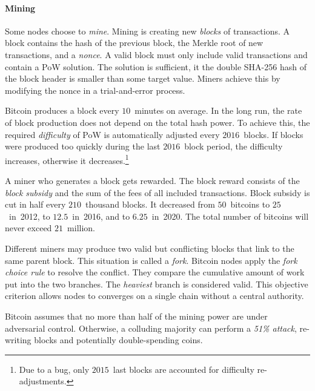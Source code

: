 \paragraph{Mining}

Some nodes choose to \textit{mine}.
Mining is creating new \textit{blocks} of transactions.
A block contains the hash of the previous block, the Merkle root of new transactions, and a \textit{nonce}.
A valid block must only include valid transactions and contain a PoW solution.
The solution is sufficient, it the double SHA-256 hash of the block header is smaller than some target value.
Miners achieve this by modifying the nonce in a trial-and-error process.

Bitcoin produces a block every $10$~minutes on average.
In the long run, the rate of block production does not depend on the total hash power.
To achieve this, the required \textit{difficulty} of PoW is automatically adjusted every $2016$~blocks.
If blocks were produced too quickly during the last $2016$~block period, the difficulty increases, otherwise it decreases.\footnote{Due to a bug, only $2015$~last blocks are accounted for difficulty re-adjustments.}

A miner who generates a block gets rewarded.
The block reward consists of the \textit{block subsidy} and the sum of the fees of all included transactions.
Block subsidy is cut in half every $210$~thousand blocks.
It decreased from $50$~bitcoins to $25$~in~2012, to $12.5$~in~2016, and to $6.25$~in~2020.
The total number of bitcoins will never exceed $21$~million.

Different miners may produce two valid but conflicting blocks that link to the same parent block.
This situation is called a \textit{fork}.
Bitcoin nodes apply the \textit{fork choice rule} to resolve the conflict.
They compare the cumulative amount of work put into the two branches.
The \textit{heaviest} branch is considered valid.
This objective criterion allows nodes to converges on a single chain without a central authority.

Bitcoin assumes that no more than half of the mining power are under adversarial control.
Otherwise, a colluding majority can perform a \textit{51\% attack}, re-writing blocks and potentially double-spending coins.

